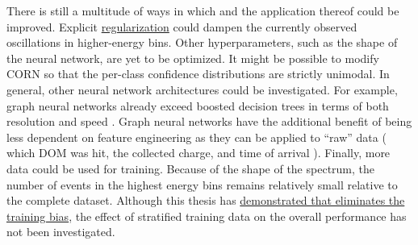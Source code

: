 There is still a multitude of ways in which \dsea{} and the application thereof could be improved.
%
Explicit \hyperref[sec:dsea:deconvolution_problem:regularization]{regularization}
could dampen the currently observed oscillations in higher-energy bins.
%
Other hyperparameters,
  such as the shape of the neural network,
are yet to be optimized.
%
It might be possible to modify \ac{CORN}
  so that the per-class confidence distributions are strictly unimodal.
In general,
other neural network architectures
  could be investigated.
For example,
  graph neural networks
  already exceed boosted decision trees
    in terms of both resolution and speed \cite{minh2021gnn}.
%
Graph neural networks
have the additional benefit of
being less dependent on feature engineering
  as they can be applied to \enquote{raw} data
    (%
      which \ac{DOM} was hit,
      the collected charge, %
      and time of arrival%
    ).
%
Finally,
  more data could be used for training.
Because of the shape of the spectrum,
  the number of events in the highest energy bins
  remains relatively small
    relative to the complete dataset.
Although this thesis has \hyperref[sec:unfolding:bias]{demonstrated that \dsea{} eliminates the training bias},
  the effect of stratified training data on the overall performance
  has not been investigated.



